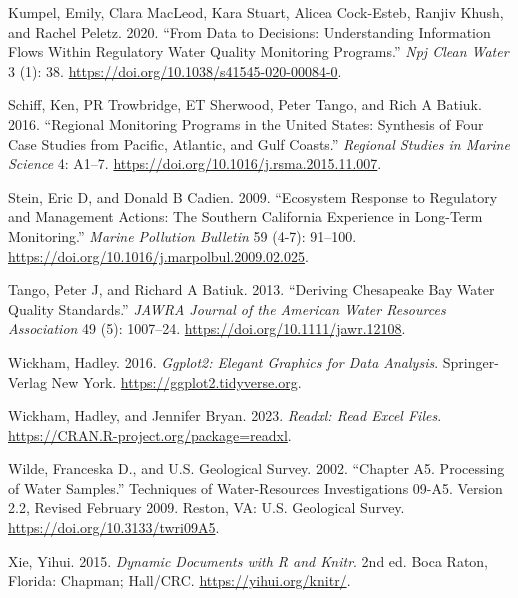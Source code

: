 \begin{CSLReferences}{1}{0}
\leavevmode{}%
Kumpel, Emily, Clara MacLeod, Kara Stuart, Alicea Cock-Esteb, Ranjiv Khush, and Rachel Peletz. 2020. {``From Data to Decisions: Understanding Information Flows Within Regulatory Water Quality Monitoring Programs.''} \emph{Npj Clean Water} 3 (1): 38. \url{https://doi.org/10.1038/s41545-020-00084-0}.

\leavevmode{}%
Schiff, Ken, PR Trowbridge, ET Sherwood, Peter Tango, and Rich A Batiuk. 2016. {``Regional Monitoring Programs in the United States: Synthesis of Four Case Studies from Pacific, Atlantic, and Gulf Coasts.''} \emph{Regional Studies in Marine Science} 4: A1--7. \url{https://doi.org/10.1016/j.rsma.2015.11.007}.

\leavevmode{}%
Stein, Eric D, and Donald B Cadien. 2009. {``Ecosystem Response to Regulatory and Management Actions: The Southern California Experience in Long-Term Monitoring.''} \emph{Marine Pollution Bulletin} 59 (4-7): 91--100. \url{https://doi.org/10.1016/j.marpolbul.2009.02.025}.

\leavevmode{}%
Tango, Peter J, and Richard A Batiuk. 2013. {``Deriving {C}hesapeake {B}ay Water Quality Standards.''} \emph{JAWRA Journal of the American Water Resources Association} 49 (5): 1007--24. \url{https://doi.org/10.1111/jawr.12108}.

\leavevmode{}%
Wickham, Hadley. 2016. \emph{Ggplot2: Elegant Graphics for Data Analysis}. Springer-Verlag New York. \url{https://ggplot2.tidyverse.org}.

\leavevmode{}%
Wickham, Hadley, and Jennifer Bryan. 2023. \emph{Readxl: Read Excel Files}. \url{https://CRAN.R-project.org/package=readxl}.

\leavevmode{}%
Wilde, Franceska D., and U.S. Geological Survey. 2002. {``Chapter A5. Processing of Water Samples.''} Techniques of Water-Resources Investigations 09-A5. Version 2.2, Revised February 2009. Reston, VA: U.S. Geological Survey. \url{https://doi.org/10.3133/twri09A5}.

\leavevmode{}%
Xie, Yihui. 2015. \emph{Dynamic Documents with {R} and Knitr}. 2nd ed. Boca Raton, Florida: Chapman; Hall/CRC. \url{https://yihui.org/knitr/}.

\end{CSLReferences}

